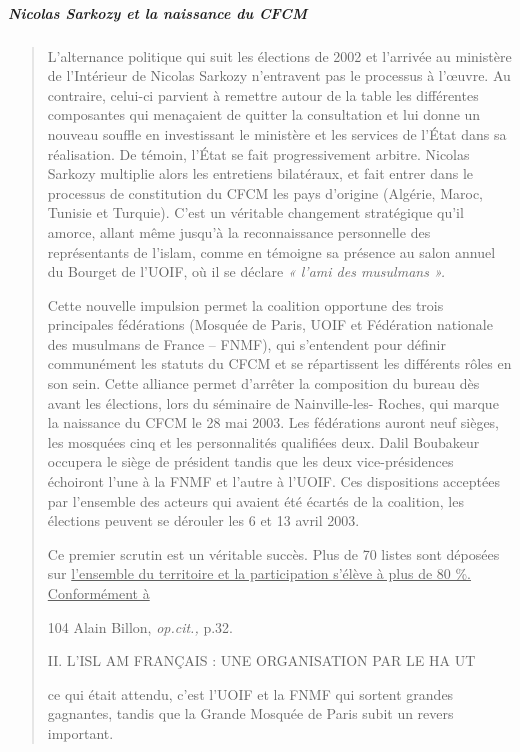 \hypertarget{nicolas-sarkozy-et-la-naissance-du-cfcm}{%
\subparagraph{Nicolas Sarkozy et la naissance du
CFCM}\label{nicolas-sarkozy-et-la-naissance-du-cfcm}}

\begin{quote}
L'alternance politique qui suit les élections de 2002 et l'arrivée au
ministère de l'Intérieur de Nicolas Sarkozy n'entravent pas le processus
à l'œuvre. Au contraire, celui-ci parvient à remettre autour de la table
les différentes composantes qui menaçaient de quitter la consultation et
lui donne un nouveau souffle en investissant le ministère et les
services de l'État dans sa réalisation. De témoin, l'État se fait
progressivement arbitre. Nicolas Sarkozy multiplie alors les entretiens
bilatéraux, et fait entrer dans le processus de constitution du CFCM les
pays d'origine (Algérie, Maroc, Tunisie et Turquie). C'est un véritable
changement stratégique qu'il amorce, allant même jusqu'à la
reconnaissance personnelle des représentants de l'islam, comme en
témoigne sa présence au salon annuel du Bourget de l'UOIF, où il se
déclare \emph{« l'ami des musulmans ».}

Cette nouvelle impulsion permet la coalition opportune des trois
principales fédérations (Mosquée de Paris, UOIF et Fédération nationale
des musulmans de France -- FNMF), qui s'entendent pour définir
communément les statuts du CFCM et se répartissent les différents rôles
en son sein. Cette alliance permet d'arrêter la composition du bureau
dès avant les élections, lors du séminaire de Nainville-les- Roches, qui
marque la naissance du CFCM le 28 mai 2003. Les fédérations auront neuf
sièges, les mosquées cinq et les personnalités qualifiées deux. Dalil
Boubakeur occupera le siège de président tandis que les deux
vice-présidences échoiront l'une à la FNMF et l'autre à l'UOIF. Ces
dispositions acceptées par l'ensemble des acteurs qui avaient été
écartés de la coalition, les élections peuvent se dérouler les 6 et 13
avril 2003.

Ce premier scrutin est un véritable succès. Plus de 70 listes sont
déposées sur \underline{l'ensemble du territoire et la participation
s'élève à plus de 80 \%. Conformément à}

104 Alain Billon, \emph{op.cit.,} p.32.

II. L'ISL AM FRANÇAIS : UNE ORGANISATION PAR LE HA UT

ce qui était attendu, c'est l'UOIF et la FNMF qui sortent grandes
gagnantes, tandis que la Grande Mosquée de Paris subit un revers
important.
\end{quote}

